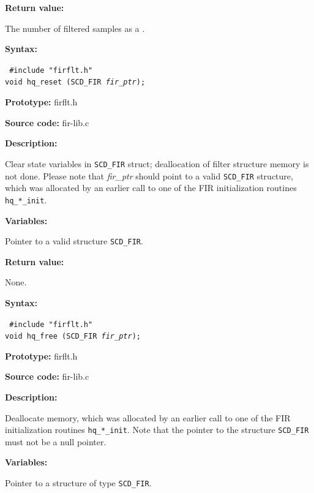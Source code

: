 {\bf Return value: }

The number of filtered samples as a \long.




{\bf Syntax: }

{\tt
\#include "firflt.h"\\
void hq\_reset (SCD\_FIR {\em *fir\_ptr});
}

{\bf Prototype: }    firflt.h

{\bf Source code: }  fir-lib.c

{\bf Description: }

Clear state variables in {\tt SCD\_FIR} struct; deallocation of filter
structure memory is not done. Please note that {\em fir\_ptr} should
point to a valid {\tt SCD\_FIR} structure, which was allocated by an
earlier call to one of the FIR initialization routines {\tt
hq\_*\_init}.

{\bf Variables: }
\begin{Descr}{\DescrLen}
\item[\pbox{20mm}{\em fir\_ptr}] %
        Pointer to a valid structure {\tt SCD\_FIR}.
\end{Descr}


{\bf Return value: }

        None.




{\bf Syntax: }

{\tt
\#include "firflt.h"\\
void hq\_free (SCD\_FIR {\em *fir\_ptr});
}

{\bf Prototype: }    firflt.h

{\bf Source code: }  fir-lib.c

{\bf Description: }

Deallocate memory, which was allocated by an earlier call to one of the
FIR initialization routines {\tt hq\_*\_init}. Note that the pointer to
the structure {\tt SCD\_FIR} must not be a null pointer.

{\bf Variables: }
\begin{Descr}{\DescrLen}
\item[\pbox{20mm}{\em fir\_ptr}] Pointer to a structure of type {\tt SCD\_FIR}.
\end{Descr}

